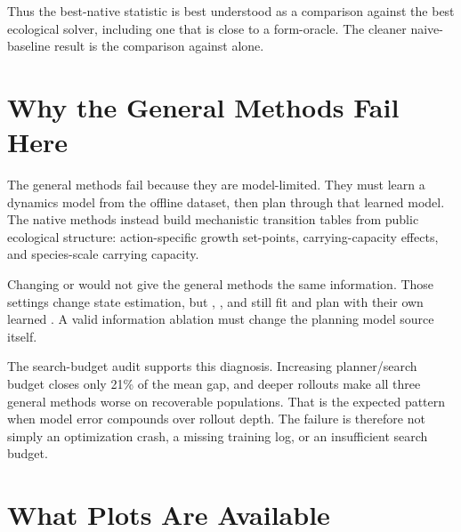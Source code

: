 \documentclass[11pt]{article}
\begin{document}
Thus the best-native statistic is best understood as a comparison against the
best ecological solver, including one that is close to a form-oracle. The
cleaner naive-baseline result is the comparison against 
alone.

\section{Why the General Methods Fail Here}

The general methods fail because they are model-limited. They must learn a
dynamics model from the offline dataset, then plan through that learned model.
The native methods instead build mechanistic transition tables from public
ecological structure: action-specific growth set-points, carrying-capacity
effects, and species-scale carrying capacity.

Changing  or  would not give the
general methods the same information. Those settings change state estimation,
but , , and  still fit and plan with
their own learned . A valid information
ablation must change the planning model source itself.

The search-budget audit supports this diagnosis. Increasing planner/search
budget closes only 21\% of the mean gap, and deeper rollouts make all three
general methods worse on recoverable populations. That is the expected pattern
when model error compounds over rollout depth. The failure is therefore not
simply an optimization crash, a missing training log, or an insufficient search
budget.

\section{What Plots Are Available}
\end{document}
